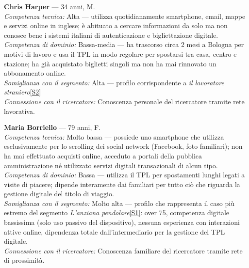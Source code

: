 ﻿\documentclass[11pt,a4paper]{article}
\begin{document}
\begin{tcolorbox}[base]
\textbf{Chris Harper} --- 34 anni, M.\\[0.3cm]
\textit{Competenza tecnica:} Alta --- utilizza quotidianamente
smartphone, email, mappe e servizi online in inglese; è abituato
a cercare informazioni da solo ma non conosce bene i sistemi
italiani di autenticazione e bigliettazione digitale.\\[0.2cm]
\textit{Competenza di dominio:} Bassa-media --- ha trascorso circa 2 mesi a Bologna per motivi di lavoro e usa il TPL in modo
regolare per spostarsi tra casa, centro e stazione; ha già
acquistato biglietti singoli ma non ha mai rinnovato un
abbonamento online.\\[0.2cm]
\textit{Somiglianza con il segmento:} Alta --- profilo
corrispondente a \textit{il lavoratore straniero}\hyperref[seg:straniero]{[S2]}\\[0.2cm]
\textit{Connessione con il ricercatore:} Conoscenza personale
del ricercatore tramite rete lavorativa.

\vspace{0.2cm}

\textbf{Maria Borriello} --- 79 anni, F.\\[0.3cm]
\textit{Competenza tecnica:} Molto bassa --- possiede uno
smartphone che utilizza esclusivamente per lo scrolling dei
social network (Facebook, foto familiari); non ha mai
effettuato acquisti online, acceduto a portali della
pubblica amministrazione né utilizzato servizi digitali
transazionali di alcun tipo.\\[0.2cm]
\textit{Competenza di dominio:} Bassa  --- utilizza il TPL
per spostamenti lunghi legati a visite di piacere; dipende interamente dai familiari per tutto ciò
che riguarda la gestione digitale del titolo di viaggio.\\[0.2cm]
\textit{Somiglianza con il segmento:} Molto alta --- profilo
che rappresenta il caso più estremo del segmento
\textit{L'anziana pendolare}\hyperref[seg:anziana]{[S1]}: over 75, competenza digitale
bassissima (solo uso passivo del dispositivo), nessuna
esperienza con interazioni attive online, dipendenza totale
dall'intermediario per la gestione del TPL digitale.\\[0.2cm]
\textit{Connessione con il ricercatore:} Conoscenza familiare
del ricercatore tramite rete di prossimità.

\end{tcolorbox}

\vspace{0.2cm}
\end{document}
